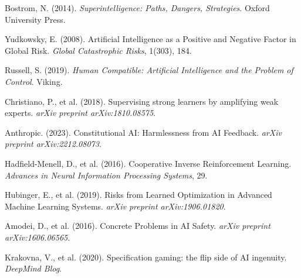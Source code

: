 \documentclass{article}
\begin{document}

\begin{thebibliography}{9}

Bostrom, N. (2014). 
\textit{Superintelligence: Paths, Dangers, Strategies}. 
Oxford University Press.

Yudkowsky, E. (2008).
Artificial Intelligence as a Positive and Negative Factor in Global Risk.
\textit{Global Catastrophic Risks}, 1(303), 184.

Russell, S. (2019).
\textit{Human Compatible: Artificial Intelligence and the Problem of Control}.
Viking.

Christiano, P., et al. (2018).
Supervising strong learners by amplifying weak experts.
\textit{arXiv preprint arXiv:1810.08575}.

Anthropic. (2023).
Constitutional AI: Harmlessness from AI Feedback.
\textit{arXiv preprint arXiv:2212.08073}.

Hadfield-Menell, D., et al. (2016).
Cooperative Inverse Reinforcement Learning.
\textit{Advances in Neural Information Processing Systems}, 29.

Hubinger, E., et al. (2019).
Risks from Learned Optimization in Advanced Machine Learning Systems.
\textit{arXiv preprint arXiv:1906.01820}.

Amodei, D., et al. (2016).
Concrete Problems in AI Safety.
\textit{arXiv preprint arXiv:1606.06565}.

Krakovna, V., et al. (2020).
Specification gaming: the flip side of AI ingenuity.
\textit{DeepMind Blog}.

\end{thebibliography}
\end{document}
